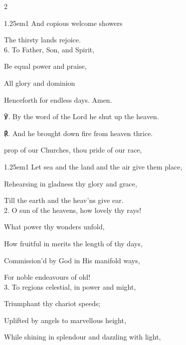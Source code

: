 \begin{paracol}{2}
\begin{hangparas}{1.25em}{1}
And copious welcome showers

The thirsty lands rejoice.\\

6. To Father, Son, and Spirit,

Be equal power and praise,

All glory and dominion

Henceforth for endless days. Amen.\\
\end{hangparas}

    ℣. By the word of the Lord he shut up the heaven.

	℟. And he brought down fire from heaven thrice.


\switchcolumn

\secondEvensong
{}

\secondEvensongHymn
{} prop of our Churches, thou pride of our race,


\begin{hangparas}{1.25em}{1}
Let sea and the land and the air give them place,

Rehearsing in gladness thy glory and grace,

Till the earth and the heav'ns give ear.\\

2. O sun of the heavens, how lovely thy rays!

What power thy wonders unfold,

How fruitful in merits the length of thy days,

Commission'd by God in His manifold ways,

For noble endeavours of old!\\

3. To regions celestial, in power and might,

Triumphant thy chariot speeds;

Uplifted by angels to marvellous height,

While shining in splendour and dazzling with light,


\end{hangparas}
\end{paracol}
